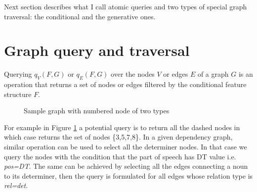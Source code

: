 Next section describes what I call atomic queries and two types of special graph traversal: the conditional and the generative ones. 

\section{Graph query and traversal}

\begin{definition}\label{def:query}
    Querying $q_{V}(F,G)$ or $q_{E}(F,G)$ over the nodes $V$ or edges $E$ of a graph $G$ is an operation that returns a set of nodes or edges filtered by the conditional feature structure $F$.
\end{definition}


\begin{figure}[!ht]
    \centering
    \caption{Sample graph with numbered node of two types}
    \label{fig:example-traversal1}
\end{figure}

For example in Figure \ref{fig:example-traversal1} a potential query is to return all the dashed nodes in which case returns the set of nodes \{3,5,7,8\}. In a given dependency graph, similar operation can be used to select all the determiner nodes. In that case we query the nodes with the condition that the part of speech has DT value i.e. \textit{pos=DT}. The same can be achieved by selecting all the edges connecting a noun to its determiner, then the query is formulated for all edges whose relation type is \textit{rel=det}.

